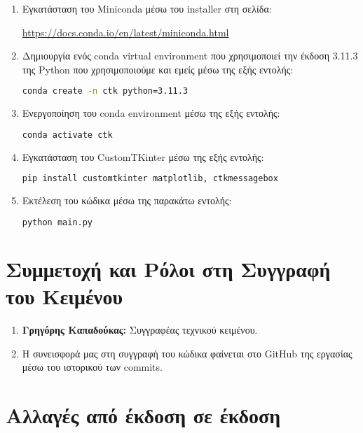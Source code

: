 \documentclass[12pt,a4paper]{article}
\begin{document}
\begin{enumerate}
    \item Εγκατάσταση του Miniconda μέσω του installer στη σελίδα:

        \textcolor{blue}{\href{https://docs.conda.io/en/latest/miniconda.html}{https://docs.conda.io/en/latest/miniconda.html}}
    \item Δημιουργία ενός conda virtual environment που χρησιμοποιεί την έκδοση 3.11.3 της Python που χρησιμοποιούμε και εμείς μέσω της εξής εντολής:

\begin{lstlisting}[language=Bash]
conda create -n ctk python=3.11.3\end{lstlisting}

    \item Ενεργοποίηση του conda environment μέσω της εξής εντολής:

\begin{lstlisting}[language=Bash]
conda activate ctk\end{lstlisting}

    \item Εγκατάσταση του CustomTKinter μέσω της εξής εντολής:

\begin{lstlisting}[language=Bash]
pip install customtkinter matplotlib, ctkmessagebox\end{lstlisting}

    \item Εκτέλεση του κώδικα μέσω της παρακάτω εντολής:
\begin{lstlisting}[language=Bash]
python main.py\end{lstlisting}

\end{enumerate}

\section{Συμμετοχή και Ρόλοι στη Συγγραφή του Κειμένου}
\begin{enumerate}
	\item \textbf{Γρηγόρης Καπαδούκας:} Συγγραφέας τεχνικού κειμένου.
    \item Η συνεισφορά μας στη συγγραφή του κώδικα φαίνεται στο GitHub της εργασίας μέσω του ιστορικού των commits.
\end{enumerate}

\section{Αλλαγές από έκδοση σε έκδοση}
\end{document}
